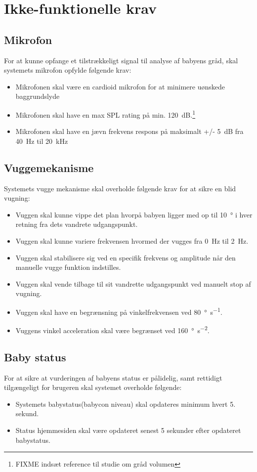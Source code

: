 \section{Ikke-funktionelle krav}

\subsection*{Mikrofon}
For at kunne opfange et tilstrækkeligt signal til analyse af babyens gråd, skal systemets mikrofon opfylde følgende krav:
\begin{itemize}
\item Mikrofonen skal være en cardioid mikrofon for at minimere uønskede baggrundslyde
\item Mikrofonen skal have en max SPL rating på min. \SI{120}{\dB}.\footnote{FIXME indsæt reference til studie om gråd volumen}
\item Mikrofonen skal have en jævn frekvens respons på maksimalt +/- \SI{5}{\dB} fra \SI{40}{\hertz} til \SI{20}{\kilo\hertz}
\end{itemize}

\subsection*{Vuggemekanisme}

Systemets vugge mekanisme skal overholde følgende krav for at sikre en blid vugning:
\begin{itemize}
\item Vuggen skal kunne vippe det plan hvorpå babyen ligger med op til \SI{10}{\degree} i hver retning fra dets vandrete udgangspunkt.
\item Vuggen skal kunne variere frekvensen hvormed der vugges fra \SI{0}{\hertz} til \SI{2}{\hertz}.
\item Vuggen skal stabilisere sig ved en specifik frekvens og amplitude når den manuelle vugge funktion indstilles.
\item Vuggen skal vende tilbage til sit vandrette udgangspunkt ved manuelt stop af vugning.
\item Vuggen skal have en begrænsning på vinkelfrekvensen ved \SI{80}{\degree\per\second}.
\item Vuggens vinkel acceleration skal være begrænset ved \SI{160}{\degree\per\square\second}.
\end{itemize}

\subsection*{Baby status}
For at sikre at vurderingen af babyens status er pålidelig, samt rettidigt tilgængeligt for brugeren skal systemet overholde følgende:
\begin{itemize}
\item Systemets babystatus(babycon niveau) skal opdateres minimum hvert 5. sekund.
\item Status hjemmesiden skal være opdateret senest 5 sekunder efter opdateret babystatus.
\end{itemize}
